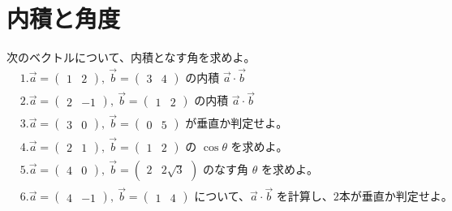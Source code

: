 \documentclass[paper=b4j,landscape,twocolumn,fleqn]{jlreq}
\begin{document}
\section{内積と角度}
次のベクトルについて、内積となす角を求めよ。
\begin{align*}
　&1.　\vec{a}=\begin{pmatrix}1 & 2\end{pmatrix},\ \vec{b}=\begin{pmatrix}3 & 4\end{pmatrix}\text{ の内積 }\vec{a}\cdot\vec{b}\\[0.45em]
　&2.　\vec{a}=\begin{pmatrix}2 & -1\end{pmatrix},\ \vec{b}=\begin{pmatrix}1 & 2\end{pmatrix}\text{ の内積 }\vec{a}\cdot\vec{b}\\[0.45em]
　&3.　\vec{a}=\begin{pmatrix}3 & 0\end{pmatrix},\ \vec{b}=\begin{pmatrix}0 & 5\end{pmatrix}\text{ が垂直か判定せよ。}\\[0.45em]
　&4.　\vec{a}=\begin{pmatrix}2 & 1\end{pmatrix},\ \vec{b}=\begin{pmatrix}1 & 2\end{pmatrix}\text{ の }\cos\theta\text{ を求めよ。}\\[0.45em]
　&5.　\vec{a}=\begin{pmatrix}4 & 0\end{pmatrix},\ \vec{b}=\begin{pmatrix}2 & 2\sqrt{3}\end{pmatrix}\text{ のなす角 }\theta\text{ を求めよ。}\\[0.45em]
　&6.　\vec{a}=\begin{pmatrix}4 & -1\end{pmatrix},\ \vec{b}=\begin{pmatrix}1 & 4\end{pmatrix}\text{ について、}\vec{a}\cdot\vec{b}\text{ を計算し、2本が垂直か判定せよ。}\\[0.45em]
\end{align*}
\end{document}
